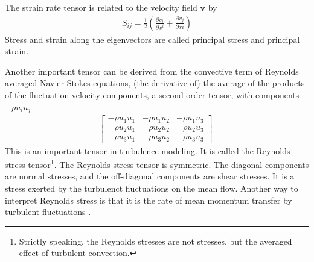 \documentclass[main.tex]{subfiles}
\begin{document}
The strain rate tensor is related to the velocity field $\mathbf{v}$ by
\begin{align*}
S_{ij} = 
\frac{1}{2}\left(\frac{\partial v_i}{\partial x^i} + \frac{\partial v_j}{\partial xi}\right)
\end{align*}
Stress and strain along the eigenvectors are called principal
stress and principal strain.

Another important tensor can be derived from the convective term of Reynolds averaged 
Navier Stokes equations, (the derivative of) the average of the products of the fluctuation 
velocity components, a second order tensor, with components $-\rho\overline{u_iu_j}$
\begin{align*}
\begin{bmatrix}
-\rho u_1u_1 & -\rho u_1u_2 & -\rho u_1u_3\\
-\rho u_2u_1 & -\rho u_2u_2 & -\rho u_2u_3\\
-\rho u_3u_1 & -\rho u_3u_2 & -\rho u_3u_3
\end{bmatrix}.
\end{align*}
This is an important tensor in turbulence modeling. It is called the Reynolds
stress tensor\footnote{Strictly speaking, the Reynolds stresses are not stresses, but the averaged 
effect of turbulent convection.}. 
The Reynolds stress tensor is symmetric. The diagonal
components are normal stresses, and the off-diagonal components are shear stresses. It is a
stress exerted by the turbulenct fluctuations on the mean flow. Another way to interpret
Reynolds stress is that it is the rate of mean momentum transfer by turbulent fluctuations 
\cite{KC08}.
\end{document}
